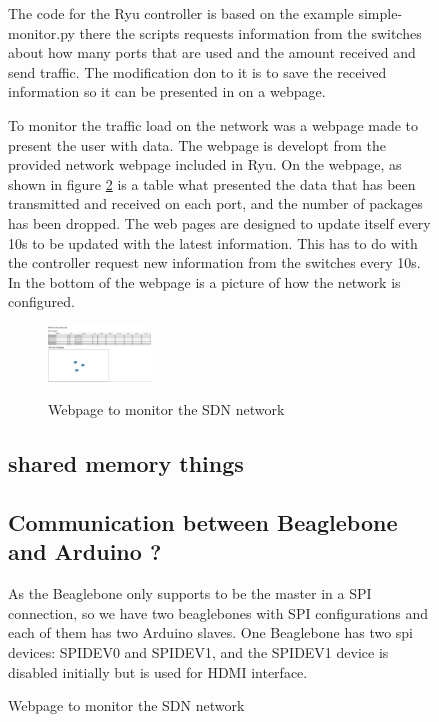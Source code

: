 \documentclass[11pt, titlepage]{article} %
\begin{document}
\begin{figure}
The code for the Ryu controller is based on the example simple-monitor.py there the scripts requests information from the switches about how many ports that are used and the amount received and send traffic. The modification don to it is to save the received information so it can be presented in on a webpage.

To monitor the traffic load on the network was a webpage made to present the user with data. The webpage is developt from the provided network webpage included in Ryu. On the webpage, as shown in figure \ref{fig:webpage_sdn} is a table what presented the data that has been transmitted and received on each port, and the number of packages has been dropped. The web pages are designed to update itself every 10s to be updated with the latest information.  This has to do with the controller request new information from the switches every 10s.  In the bottom of the webpage is a picture of how the network is configured. 

\begin{figure}
	\includegraphics[width=0.3\textwidth]{webpage.PNG}
	\label{fig:webpage_sdn}
	\caption{Webpage to monitor the SDN network}
\end{figure}


\subsection{shared memory things}

\subsection{Communication between Beaglebone and Arduino ?}
As the Beaglebone only supports to be the master in a SPI connection, so we have two beaglebones with SPI configurations and each of them has two Arduino slaves. One Beaglebone has two spi devices: SPIDEV0 and SPIDEV1, and the SPIDEV1 device is disabled initially but is used for HDMI interface. 


\end{figure}
\end{document}
